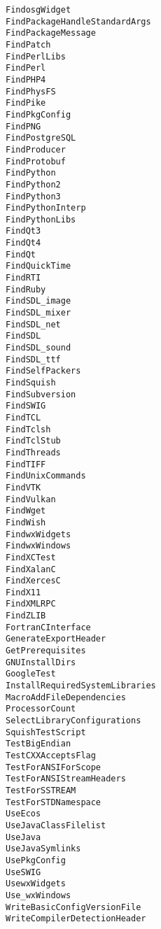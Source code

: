 \documentclass{article}
\begin{document}
\hfill\vline\hfill
\begin{minipage}[t]{0.18\linewidth}
\begin{verbatim}
FindosgWidget
FindPackageHandleStandardArgs
FindPackageMessage
FindPatch
FindPerlLibs
FindPerl
FindPHP4
FindPhysFS
FindPike
FindPkgConfig
FindPNG
FindPostgreSQL
FindProducer
FindProtobuf
FindPython
FindPython2
FindPython3
FindPythonInterp
FindPythonLibs
FindQt3
FindQt4
FindQt
FindQuickTime
FindRTI
FindRuby
FindSDL_image
FindSDL_mixer
FindSDL_net
FindSDL
FindSDL_sound
FindSDL_ttf
FindSelfPackers
FindSquish
FindSubversion
FindSWIG
FindTCL
FindTclsh
FindTclStub
FindThreads
FindTIFF
FindUnixCommands
FindVTK
FindVulkan
FindWget
FindWish
FindwxWidgets
FindwxWindows
FindXCTest
FindXalanC
FindXercesC
FindX11
FindXMLRPC
FindZLIB
FortranCInterface
GenerateExportHeader
GetPrerequisites
GNUInstallDirs
GoogleTest
InstallRequiredSystemLibraries
MacroAddFileDependencies
ProcessorCount
SelectLibraryConfigurations
SquishTestScript
TestBigEndian
TestCXXAcceptsFlag
TestForANSIForScope
TestForANSIStreamHeaders
TestForSSTREAM
TestForSTDNamespace
UseEcos
UseJavaClassFilelist
UseJava
UseJavaSymlinks
UsePkgConfig
UseSWIG
UsewxWidgets
Use_wxWindows
WriteBasicConfigVersionFile
WriteCompilerDetectionHeader
\end{verbatim}
\end{minipage}

\pagebreak
\end{document}
